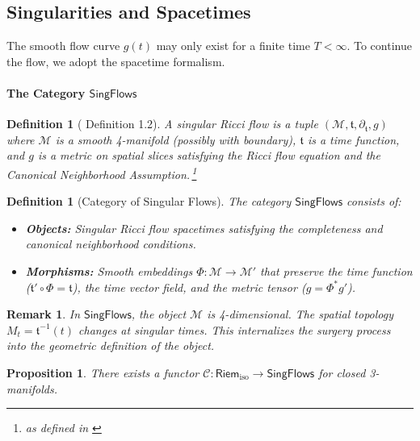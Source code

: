 \documentclass[11pt]{article}
\newtheorem{proposition}[theorem]{Proposition}
\newtheorem{definition}[theorem]{Definition}
\newtheorem{remark}[theorem]{Remark}
\newcommand{\RiemIso}{\mathsf{Riem}_{\mathrm{iso}}}
\newcommand{\SingFlows}{\mathsf{SingFlows}}
\begin{document}
\subsection*{Singularities and Spacetimes}
The smooth flow curve $g(t)$ may only exist for a finite time $T < \infty$. To continue the flow, we adopt the spacetime formalism.
\paragraph{The Category $\SingFlows$}
\begin{definition}[\cite{BK19} Definition 1.2]
A singular Ricci flow is a tuple $(\mathcal{M}, \mathfrak{t}, \partial_{\mathfrak{t}}, g)$ where $\mathcal{M}$ is a smooth 4-manifold (possibly with boundary), $\mathfrak{t}$ is a time function, and $g$ is a metric on spatial slices satisfying the Ricci flow equation and the Canonical Neighborhood Assumption.\,\footnote{as defined in \cite[Definition 5.7]{BK19} }
\end{definition}
\begin{definition}[Category of Singular Flows]
The category $\SingFlows$ consists of:
\begin{itemize}
    \item \textbf{Objects:} Singular Ricci flow spacetimes satisfying the completeness and canonical neighborhood conditions.
    \item \textbf{Morphisms:} Smooth embeddings $\Phi: \mathcal{M} \longrightarrow\mathcal{M}'$ that preserve the time function ($\mathfrak{t}' \circ \Phi = \mathfrak{t}$), the time vector field, and the metric tensor ($g = \Phi^* g'$).
\end{itemize}
\end{definition}
\begin{remark}
In $\SingFlows$, the object $\mathcal{M}$ is 4-dimensional. The spatial topology $M_t = \mathfrak{t}^{-1}(t)$ changes at singular times. This internalizes the surgery process into the geometric definition of the object.
\end{remark}
\begin{proposition}
There exists a functor $\mathcal{C}: \RiemIso \longrightarrow\SingFlows$ for closed 3-manifolds.
\end{proposition}
\end{document}
